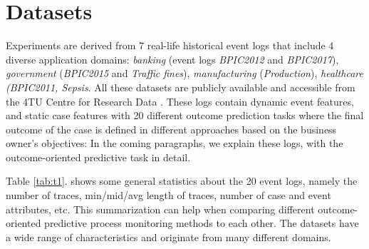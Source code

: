 \section{Datasets}
Experiments are derived from $7$ real-life historical event logs that include $4$ diverse application domains: \textit{banking} (event logs \textit{BPIC2012} and \textit{BPIC2017}), \textit{government} (\textit{BPIC2015} and \textit{Traffic fines}), \textit{manufacturing} (\textit{Production}), \textit{healthcare (BPIC2011, Sepsis}. All these datasets are publicly available and accessible from the 4TU Centre for Research Data \cite{4TU}. These logs contain dynamic event features, and static case features with 20 different outcome prediction tasks \cite{teinemaa2019outcome} where the final outcome of the case is defined in different approaches based on the business owner's objectives:  In the coming paragraphs, we explain these logs, with the outcome-oriented predictive task in detail.

Table \ref{tab:t1}. shows some general statistics about the 20 event logs, namely the number of traces, min/mid/avg length of traces, number of case and event attributes, etc. This summarization can help when comparing different outcome-oriented predictive process monitoring methods to each other. The datasets have a wide range of characteristics and originate from many different domains.


